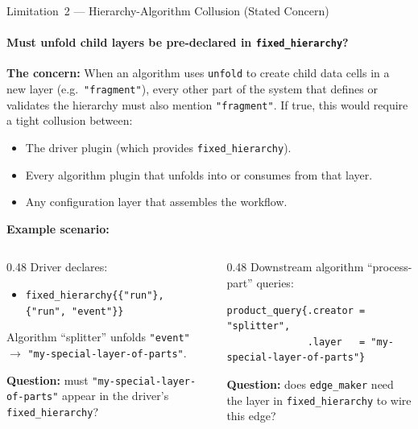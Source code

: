 \documentclass[aspectratio=169,10pt]{beamer}
\newcommand{\code}[1]{\texttt{\small #1}}
\begin{document}
\begin{frame}{Limitation~2 --- Hierarchy-Algorithm Collusion (Stated Concern)}
  \framesubtitle{Must unfold child layers be pre-declared in \texttt{fixed\_hierarchy}?}

  \textbf{The concern:}  When an algorithm uses \code{unfold} to create
  child data cells in a new layer (e.g.\ \code{"fragment"}), every other
  part of the system that defines or validates the hierarchy must also
  mention \code{"fragment"}.  If true, this would require a tight collusion
  between:

  \begin{itemize}
    \item The driver plugin (which provides \code{fixed\_hierarchy}).
    \item Every algorithm plugin that unfolds into or consumes from that layer.
    \item Any configuration layer that assembles the workflow.
  \end{itemize}

  \medskip
  \textbf{Example scenario:}

  \begin{columns}[T]
    \begin{column}{0.48\textwidth}
      \small
      Driver declares:
      \begin{itemize}\small
        \item \code{fixed\_hierarchy\{\{"\!run"\}, \{"\!run", "\!event"\}\}}
      \end{itemize}
      Algorithm ``splitter'' unfolds \code{"event"} $\to$
      \code{"my-special-layer-of-parts"}.

      \medskip
      \textbf{Question:} must \code{"my-special-layer-of-parts"} appear in
      the driver's \code{fixed\_hierarchy}?
    \end{column}
    \begin{column}{0.48\textwidth}
      \small
      Downstream algorithm ``process-part'' queries:
      \begin{lstlisting}
product_query{.creator = "splitter",
              .layer   = "my-special-layer-of-parts"}
      \end{lstlisting}
      \textbf{Question:} does \code{edge\_maker} need the layer in
      \code{fixed\_hierarchy} to wire this edge?
    \end{column}
  \end{columns}
\end{frame}

\end{document}
